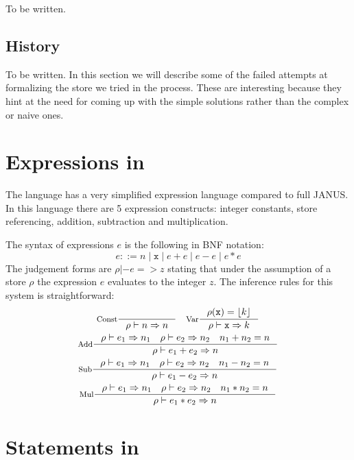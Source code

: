 
To be written.



\subsection{History}

To be written. In this section we will describe some of the failed
attempts at formalizing the store we tried in the process. These are
interesting because they hint at the need for coming up with the
simple solutions rather than the complex or naive ones.

\section{Expressions in \janusz{}}

The \janusz{} language has a very simplified expression language
compared to full JANUS. In this language there are 5 expression
constructs: integer constants, store referencing, addition,
subtraction and multiplication.

The syntax of expressions $e$ is the following in BNF notation:
\newcommand{\bor}{\; | \;}
\begin{equation*}
  e ::= n \bor \mathtt{x} \bor e + e \bor e - e \bor e * e
\end{equation*}
The judgement forms are $\rho |- e => z$ stating that under the
assumption of a store $\rho$ the expression $e$ evaluates to the
integer $z$. The inference rules for this system is straightforward:
\begin{gather*}
  \inference[Const]{}{\rho |- n => n} \quad \inference[Var]{\rho(\mathtt{x}) =
    \lift{k}}{\rho |- \mathtt{x} => k} \\
  \inference[Add]{\rho |- e_1 => n_1 \quad \rho |- e_2 => n_2 \quad
    n_1 + n_2 = n}{\rho |- e_1 + e_2 => n} \\
  \inference[Sub]{\rho |- e_1 => n_1 \quad \rho |- e_2 => n_2 \quad
    n_1 - n_2 = n}{\rho |- e_1 - e_2 => n} \\
  \inference[Mul]{\rho |- e_1 => n_1 \quad \rho |- e_2 => n_2 \quad
    n_1 * n_2 = n}{\rho |- e_1 * e_2 => n}
\end{gather*}

\section{Statements in \janusz{}}

